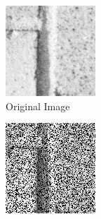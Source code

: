 \documentclass[a4paper]{article}
\begin{document}
\begin{figure}[H]
	\centering
	\begin{subfigure}{0.23\linewidth}
		\centering
		\includegraphics[width=\linewidth]{../media/Q3 texture_brick cropped.png}
		\caption{Original Image}
	\end{subfigure}
	\begin{subfigure}{0.23\linewidth}
		\centering
		\includegraphics[width=\linewidth]{../media/Q3 texture_brick all measurements.png}

\end{subfigure}
\end{figure}
\end{document}
